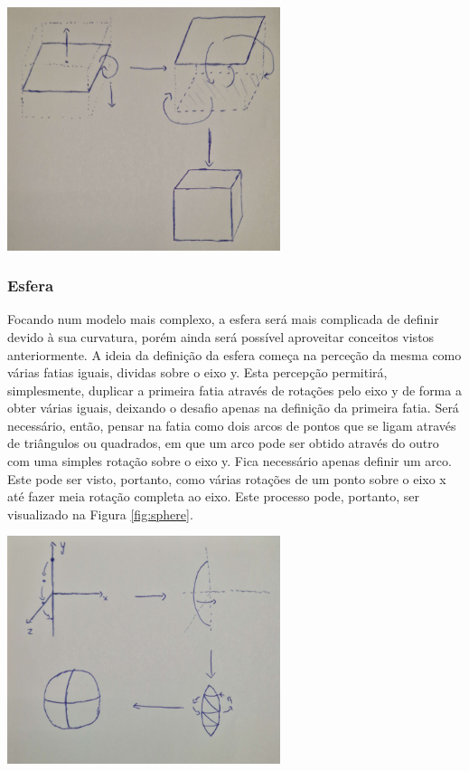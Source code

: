 \begin{center}
    \includegraphics[width=0.6\textwidth]{imgs/box.png}
    \label{fig:box}
\end{center}

\subsubsection{Esfera}

Focando num modelo mais complexo, a esfera será mais complicada de
definir devido à sua curvatura, porém ainda será possível aproveitar
conceitos vistos anteriormente.\newline
\break
\noindent
A ideia da definição da esfera começa na perceção da mesma como várias
fatias iguais, dividas sobre o eixo y. Esta percepção permitirá,
simplesmente, duplicar a primeira fatia através de rotações
pelo eixo y de forma a obter várias iguais, deixando o desafio
apenas na definição da primeira fatia.\newline
\break
\noindent
Será necessário, então, pensar na fatia como dois arcos de pontos que
se ligam através de triângulos ou quadrados, em que um arco pode ser
obtido através do outro com uma simples rotação sobre o eixo y.\newline
\break
\noindent
Fica necessário apenas definir um arco. Este pode ser visto, portanto,
como várias rotações de um ponto sobre o eixo x até fazer
meia rotação completa ao eixo.\newline
\break
\noindent
Este processo pode, portanto, ser visualizado na Figura \ref{fig:sphere}.

\begin{center}
    \includegraphics[width=0.6\textwidth]{imgs/sphere.png}
    \label{fig:sphere}
\end{center}

